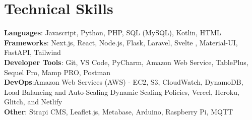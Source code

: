 \documentclass[letterpaper,11pt]{article}
\begin{document}
%
\section{Technical Skills}
 \begin{itemize}[leftmargin=0.15in, label={}]
    \small{\item{
     \textbf{Languages}{: Javascript, Python, PHP, SQL (MySQL), Kotlin, HTML} \\
     \textbf{Frameworks}{: Next.js, React, Node.js, Flask, Laravel, Svelte , Material-UI, FastAPI, Tailwind} \\
     \textbf{Developer Tools}{: Git, VS Code,  PyCharm, Amazon Web Service, TablePlus, Sequel Pro, Mamp PRO, Postman} \\
      \textbf{DevOps}{:Amazon Web Services (AWS) - EC2, S3, CloudWatch, DynamoDB, Load Balancing and Auto-Scaling Dynamic Scaling Policies, Vercel, Heroku, Glitch, and Netlify } \\
     \textbf{Other}{: Strapi CMS, Leaflet.js, Metabase, Arduino, Raspberry Pi, MQTT}
    }}
 \end{itemize}


\end{document}
